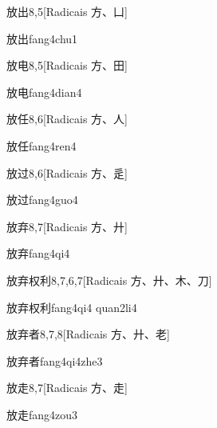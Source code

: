 \begin{entry}{放出}{8,5}[Radicais ⽅、⼐]
  \begin{phonetics}{放出}{fang4chu1}
  \end{phonetics}
\end{entry}

\begin{entry}{放电}{8,5}[Radicais ⽅、⽥]
  \begin{phonetics}{放电}{fang4dian4}
  \end{phonetics}
\end{entry}

\begin{entry}{放任}{8,6}[Radicais ⽅、⼈]
  \begin{phonetics}{放任}{fang4ren4}
  \end{phonetics}
\end{entry}

\begin{entry}{放过}{8,6}[Radicais ⽅、⾡]
  \begin{phonetics}{放过}{fang4guo4}
  \end{phonetics}
\end{entry}

\begin{entry}{放弃}{8,7}[Radicais ⽅、⼶]
  \begin{phonetics}{放弃}{fang4qi4}
  \end{phonetics}
\end{entry}

\begin{entry}{放弃权利}{8,7,6,7}[Radicais ⽅、⼶、⽊、⼑]
  \begin{phonetics}{放弃权利}{fang4qi4 quan2li4}
  \end{phonetics}
\end{entry}

\begin{entry}{放弃者}{8,7,8}[Radicais ⽅、⼶、⽼]
  \begin{phonetics}{放弃者}{fang4qi4zhe3}
  \end{phonetics}
\end{entry}

\begin{entry}{放走}{8,7}[Radicais ⽅、⾛]
  \begin{phonetics}{放走}{fang4zou3}
  \end{phonetics}
\end{entry}

